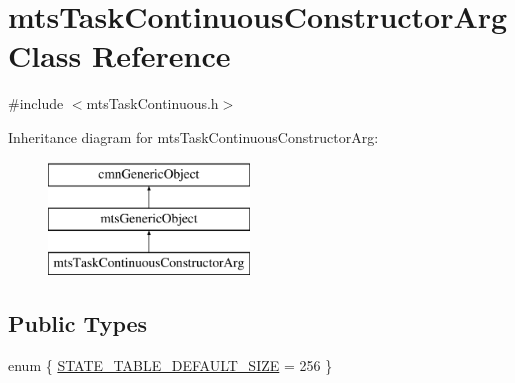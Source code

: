 \hypertarget{classmts_task_continuous_constructor_arg}{}\section{mts\+Task\+Continuous\+Constructor\+Arg Class Reference}
\label{classmts_task_continuous_constructor_arg}


{\ttfamily \#include $<$mts\+Task\+Continuous.\+h$>$}

Inheritance diagram for mts\+Task\+Continuous\+Constructor\+Arg\+:\begin{figure}[H]
\begin{center}
\leavevmode
\includegraphics[height=3.000000cm]{d2/d85/classmts_task_continuous_constructor_arg}
\end{center}
\end{figure}
\subsection*{Public Types}
\begin{DoxyCompactItemize}
\item 
enum \{ \hyperlink{classmts_task_continuous_constructor_arg_a45f2bdbbc5675e56493c3ae482366eb2aa445b554da5472573538670101b0cc34}{S\+T\+A\+T\+E\+\_\+\+T\+A\+B\+L\+E\+\_\+\+D\+E\+F\+A\+U\+L\+T\+\_\+\+S\+I\+Z\+E} = 256
 \}
\end{DoxyCompactItemize}
